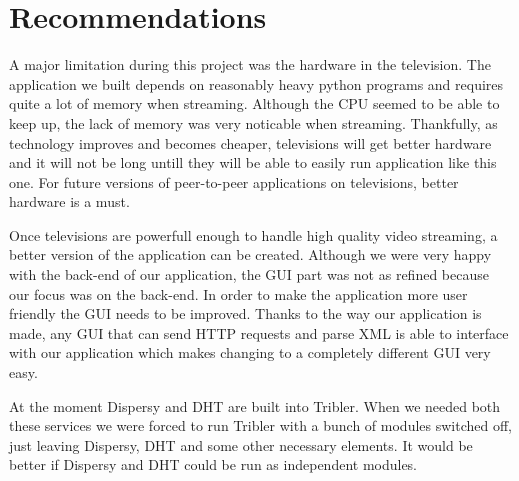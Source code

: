 \chapter{Recommendations}
\label{sec:recommendations}

A major limitation during this project was the hardware in the television. The application we built depends on reasonably heavy python programs and requires quite a lot of memory when streaming. Although the CPU seemed to be able to keep up, the lack of memory was very noticable when streaming. Thankfully, as technology improves and becomes cheaper, televisions will get better hardware and it will not be long untill they will be able to easily run application like this one. For future versions of peer-to-peer applications on televisions, better hardware is a must.

Once televisions are powerfull enough to handle high quality video streaming, a better version of the application can be created. Although we were very happy with the back-end of our application, the GUI part was not as refined because our focus was on the back-end. In order to make the application more user friendly the GUI needs to be improved. Thanks to the way our application is made, any GUI that can send HTTP requests and parse XML is able to interface with our application which makes changing to a completely different GUI very easy.

At the moment Dispersy and DHT are built into Tribler. When we needed both these services we were forced to run Tribler with a bunch of modules switched off, just leaving Dispersy, DHT and some other necessary elements. It would be better if Dispersy and DHT could be run as independent modules.

